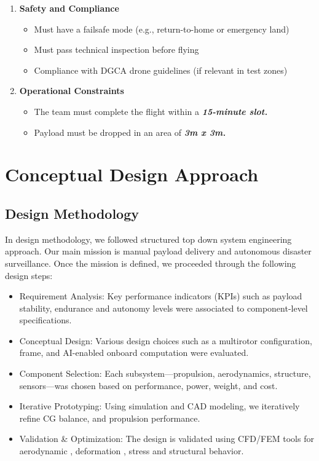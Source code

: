 \documentclass[12pt]{report}
\begin{document}
\begin{enumerate}
\begin{itemize}
        \end{itemize}
      \item \textbf{Safety and Compliance}
        \begin{itemize}
          \item Must have a failsafe mode (e.g., return-to-home or emergency land)
          \item Must pass technical inspection before flying
          \item Compliance with DGCA drone guidelines (if relevant in test zones)
        \end{itemize}
      \item \textbf{Operational Constraints}
        \begin{itemize}
          \item The team must complete the flight within a \textbf{\textit{15-minute slot.}}
          \item Payload must be dropped in an area of \textbf{\textit{3m x 3m.}}
        \end{itemize}
    \end{enumerate}
  \chapter{Conceptual Design Approach}
    \section{Design Methodology}
    In design methodology, we followed structured top down system engineering approach. Our main mission is manual payload delivery and autonomous disaster surveillance. Once the mission is defined, we proceeded through the following design steps:
    \begin{itemize}
      \item Requirement Analysis: Key performance indicators (KPIs) such as payload stability, endurance and autonomy levels were associated to component-level specifications.
      \item Conceptual Design: Various design choices such as a multirotor configuration, frame, and AI-enabled onboard computation were evaluated.
      \item Component Selection: Each subsystem—propulsion, aerodynamics, structure, sensors—was chosen based on performance, power, weight, and cost.
      \item Iterative Prototyping: Using simulation and CAD modeling, we iteratively refine CG balance, and propulsion performance.
      \item Validation \& Optimization: The design is validated using CFD/FEM tools for aerodynamic , deformation , stress and structural behavior.

    \end{itemize}
\end{document}
